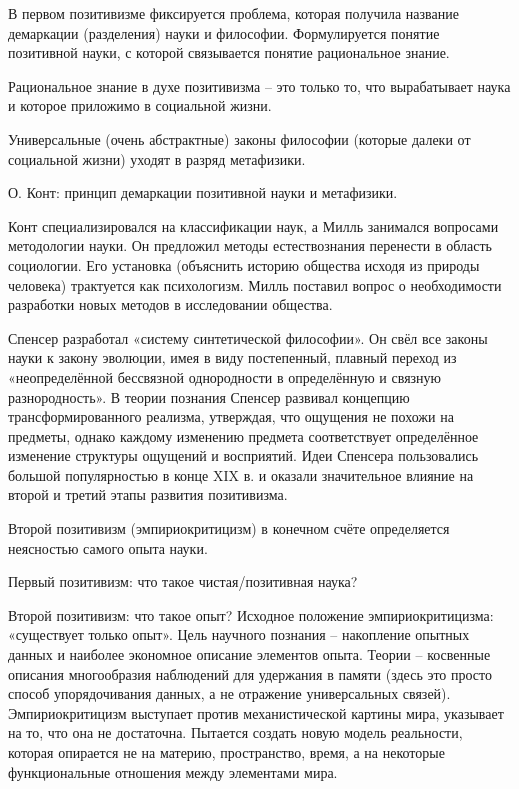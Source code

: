 \documentclass[exam_answers.tex]{subfiles}
\begin{document}
\renewcommand{\baselinestretch}{\blch}

В первом позитивизме фиксируется проблема, которая получила название демаркации (разделения) науки и философии.
Формулируется понятие позитивной науки, с которой связывается понятие рациональное знание.

Рациональное знание в духе позитивизма – это только то, что вырабатывает наука и которое приложимо в социальной жизни.

Универсальные (очень абстрактные) законы философии (которые далеки от социальной жизни) уходят в разряд метафизики.

О. Конт: принцип демаркации позитивной науки и метафизики.

Конт специализировался на классификации наук, а Милль занимался вопросами методологии науки. Он предложил методы естествознания перенести в область социологии.
Его установка (объяснить историю общества исходя из природы человека) трактуется как психологизм.
Милль поставил вопрос о необходимости разработки новых методов в исследовании общества.

Спенсер разработал «систему синтетической философии».
Он свёл все законы науки к закону эволюции, имея в виду постепенный, плавный переход из «неопределённой бессвязной однородности в определённую и связную разнородность».
В теории познания Спенсер развивал концепцию трансформированного реализма, утверждая, что ощущения не похожи на предметы, однако каждому изменению предмета соответствует определённое изменение структуры ощущений и восприятий.
Идеи Спенсера пользовались большой популярностью в конце XIX в. и оказали значительное влияние на второй и третий этапы развития позитивизма.

Второй позитивизм (эмпириокритицизм) в конечном счёте определяется неясностью самого опыта науки.

Первый позитивизм: что такое чистая/позитивная наука?

Второй позитивизм: что такое опыт?
Исходное положение эмпириокритицизма: «существует только опыт».
Цель научного познания – накопление опытных данных и наиболее экономное описание элементов опыта.
Теории – косвенные описания многообразия наблюдений для удержания в памяти (здесь это просто способ упорядочивания данных, а не отражение универсальных связей).
Эмпириокритицизм выступает против механистической картины мира, указывает на то, что она не достаточна.
Пытается создать новую модель реальности, которая опирается не на материю, пространство, время, а на некоторые функциональные отношения между элементами мира.
\end{document}
